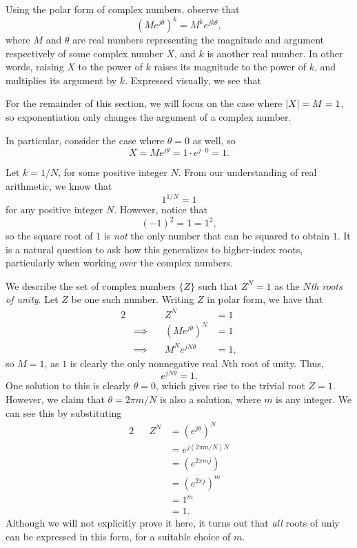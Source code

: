 \documentclass[letterpaper]{article}
\theoremstyle{remark}
\newcommand{\eqn}[1]{\begin{alignat*}{2}#1\end{alignat*}}
\newcommand*{\thus}{&\implies\quad&}
\begin{document}
Using the polar form of complex numbers, observe that
\[
    (Me^{j\theta})^k = M^k e^{jk\theta},
\]
where $M$ and $\theta$ are real numbers representing the magnitude and argument respectively of some complex number $X$, and $k$ is another real number. In other words, raising $X$ to the power of $k$ raises its magnitude to the power of $k$, and multiplies its argument by $k$. Expressed visually, we see that
\begin{center}
\end{center}

For the remainder of this section, we will focus on the case where $\abs{X} = M = 1$, so exponentiation only changes the argument of a complex number.

In particular, consider the case where $\theta = 0$ as well, so
\[
    X = Me^{j\theta} = 1 \cdot e^{j \cdot 0} = 1.
\]

Let $k = 1 / N$, for some positive integer $N$. From our understanding of real arithmetic, we know that
\[
    1^{1/N} = 1
\]
for any positive integer $N$. However, notice that
\[
    (-1)^2 = 1 = 1^2,
\]
so the square root of $1$ is \emph{not} the only number that can be squared to obtain $1$. It is a natural question to ask how this generalizes to higher-index roots, particularly when working over the complex numbers.

We describe the set of complex numbers $\{ Z \}$ such that $Z^N = 1$ as the \emph{$N$th roots of unity}. Let $Z$ be one such number. Writing $Z$ in polar form, we have that
\eqn{
    && Z^N &= 1 \\
    \thus (Me^{j\theta})^N &= 1 \\
    \thus M^N e^{jN\theta} &= 1,
}
so $M = 1$, as $1$ is clearly the only nonnegative real $N$th root of unity. Thus,
\[
    e^{jN\theta} = 1.
\]
One solution to this is clearly $\theta = 0$, which gives rise to the trivial root $Z = 1$. However, we claim that $\theta = 2\pi m / N$ is also a solution, where $m$ is any integer. We can see this by substituting
\eqn{
    && Z^N &= (e^{j\theta})^N \\
    &&&= e^{j(2\pi m / N) N} \\
    &&&= (e^{2 \pi m j}) \\
    &&&= (e^{2 \pi j})^m \\
    &&&= 1^m \\
    &&&= 1.
}
Although we will not explicitly prove it here, it turns out that \emph{all} roots of uniy can be expressed in this form, for a suitable choice of $m$.
\end{document}

